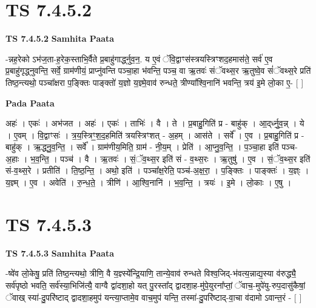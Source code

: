 \documentclass[17pt]{extarticle}
\begin{document}
\section*{ TS 7.4.5.2 }

\textbf{TS 7.4.5.2 } \newline
\textbf{Samhita Paata} \newline

-न्नह॒रेको ऽभ॑ज॒ता-ह॒रेक॒स्ताभि॒र्वैते प्र॒बाहु॑गार्द्ध्नुव॒न॒. य ए॒वं ॅवि॒द्वाꣳस॑स्त्रयस्त्रिꣳशद॒हमास॑ते॒ सर्व॑ ए॒व प्र॒बाहु॑गृद्ध्नुवन्ति॒ सर्वे॒ ग्राम॑णीयं॒ प्राप्नु॑वन्ति पञ्चा॒हा भ॑वन्ति॒ पञ्च॒ वा ऋ॒तवः॑ संॅवथ्स॒र ऋ॒तुष्वे॒व सं॑ॅवथ्स॒रे प्रति॑ तिष्ठ॒न्त्यथो॒ पञ्चा᳚क्षरा प॒ङ्क्तिः पाङ्क्तो॑ य॒ज्ञो य॒ज्ञ्मे॒वाव॑ रुन्धते॒ त्रीण्या᳚श्वि॒नानि॑ भवन्ति॒ त्रय॑ इ॒मे लो॒का ए॒- [  ] \newline

\textbf{Pada Paata} \newline

अहः॑ । एकः॑ । अभ॑जत । अहः॑ । एकः॑ । ताभिः॑ । वै । ते । प्र॒बाहु॒गिति॑ प्र - बाहु॑क् । आ॒द्‌र्ध्नु॒व॒न्न् । ये । ए॒वम् । वि॒द्वाꣳसः॑ । त्र॒य॒स्त्रिꣳ॒॒श॒द॒हमिति॑ त्रयस्त्रिꣳशत् - अ॒हम् । आस॑ते । सर्वे᳚ । ए॒व । प्र॒बाहु॒गिति॑ प्र - बाहु॑क् । ऋ॒द्ध्नु॒व॒न्ति॒ । सर्वे᳚ । ग्राम॑णीय॒मिति॒ ग्राम॑ - नी॒य॒म् । प्रेति॑ । आ॒प्नु॒व॒न्ति॒ । प॒ञ्चा॒हा इति॑ पञ्च-अ॒हाः । भ॒व॒न्ति॒ । पञ्च॑ । वै । ऋ॒तवः॑ । सं॒ॅव॒थ्स॒र इति॑ सं - व॒थ्स॒रः । ऋ॒तुषु॑ । ए॒व । सं॒ॅव॒थ्स॒र इति॑ सं-व॒थ्स॒रे । प्रतीति॑ । ति॒ष्ठ॒न्ति॒ । अथो॒ इति॑ । पञ्चा᳚क्ष॒रेति॒ पञ्च॑-अ॒क्ष॒रा॒ । प॒ङ्क्तिः । पाङ्क्तः॑ । य॒ज्ञ्ः । य॒ज्ञ्म् । ए॒व । अवेति॑ । रु॒न्ध॒ते॒ । त्रीणि॑ । आ॒श्वि॒नानि॑ । भ॒व॒न्ति॒ । त्रयः॑ । इ॒मे । लो॒काः । ए॒षु ।  \newline




\section*{ TS 7.4.5.3 }

\textbf{TS 7.4.5.3 } \newline
\textbf{Samhita Paata} \newline

-ष्वे॑व लो॒केषु॒ प्रति॑ तिष्ठ॒न्त्यथो॒ त्रीणि॒ वै य॒ज्ञ्स्ये᳚न्द्रि॒याणि॒ तान्ये॒वाव॑ रुन्धते विश्व॒जिद्-भ॑वत्य॒न्नाद्य॒स्या व॑रुद्ध्यै॒ सर्व॑पृष्ठो भवति॒ सर्व॑स्या॒भिजि॑त्यै॒ वाग्वै द्वा॑दशा॒हो यत् पु॒रस्ता᳚द् द्वादशा॒ह-मु॑पे॒युरना᳚प्तां॒ ॅवाच॒-मुपे॑यु-रुप॒दासु॑कैषां॒ ॅवाख् स्या॑-दु॒परि॑ष्टाद् द्वादशा॒हमुप॑ यन्त्या॒प्तामे॒व वाच॒मुप॑ यन्ति॒ तस्मा॑-दु॒परि॑ष्टाद्-वा॒चा व॑दामो ऽवान्त॒रं - [  ] \newline
\end{document}

